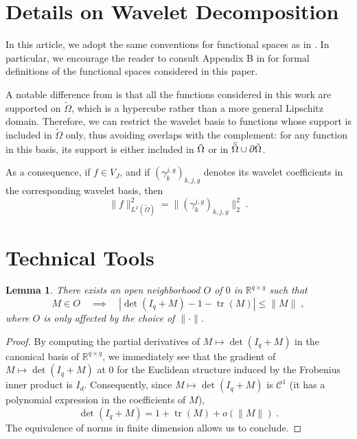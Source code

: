 \documentclass{article}
\theoremstyle{plain}
\newtheorem{lemma}[theorem]{Lemma}
\theoremstyle{definition}
\theoremstyle{remark}
\newcommand{\R}[0]{\mathbb{R}}
\newcommand\tr[0]{\operatorname{tr}}
\begin{document}
\section{Details on Wavelet Decomposition}
\label{sec:details_wavelet_decomposition}

In this article, we adopt the same conventions for functional spaces as in \cite{hutter2021minimax}. 
In particular, we encourage the reader to consult Appendix B in \cite{hutter2021minimax} for formal definitions of the functional spaces considered in this paper. 

A notable difference from \cite{hutter2021minimax} is that all the functions considered in this work are supported on $\tilde{\Omega}$, which is a hypercube rather than a more general Lipschitz domain. 
Therefore, we can restrict the wavelet basis to functions whose support is included in $\tilde{\Omega}$ only, thus avoiding overlaps with the complement: for any function in this basis, its support is either included in $\Tilde{\Omega}$ or in $\Bar{\Tilde{\Omega}} \cup \partial \Tilde{\Omega}$. 


As a consequence, if $f \in V_J$, and if $(\gamma_k^{j, g})_{k, j, g}$ denotes its wavelet coefficients in the corresponding wavelet basis, then 
\begin{equation}
    \| f \|_{L^2(\tilde{\Omega})}^2 = \|(\gamma_k^{j, g})_{k, j, g}\|_2^2 \;.
\end{equation}

\section{Technical Tools}

\begin{lemma}
    \label{lemma:linearizationdeterminant}
    There exists an open neighborhood $O$ of $0$ in $\R^{q \times q}$ such that 
    \begin{equation}
        M \in O \quad \implies \quad | \det(I_q + M) - 1 - \tr(M)| \leq \| M \| \;,
    \end{equation}
    where $O$ is only affected by the choice of $\| \cdot \|$.
\end{lemma}
\begin{proof}
    By computing the partial derivatives of $M \mapsto \det(I_q + M)$ in the canonical basis of $\R^{q \times q}$, we immediately see that the gradient of $M \mapsto \det(I_q + M)$ at $0$ for the Euclidean structure induced by the Frobenius inner product is $I_d$. Consequently, since $M \mapsto \det(I_q + M)$ is $\mathcal{C}^1$ (it has a polynomial expression in the coefficients of $M$), 
    \begin{equation}
        \det(I_q + M) = 1 + \tr(M) + o(\| M \|) \;.
    \end{equation}
    The equivalence of norms in finite dimension allows us to conclude.
\end{proof}
\end{document}
